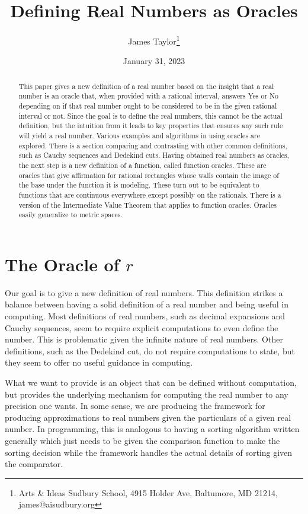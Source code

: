 \documentclass[12pt]{article}
\title{Defining Real Numbers as Oracles}
\author{
  James Taylor\footnote{Arts \& Ideas Sudbury School, 4915 Holder Ave, Baltumore, MD 21214, james@aisudbury.org}
}
\date{January 31, 2023}
\theoremstyle{remark}
\begin{document}
\maketitle
\begin{abstract}
This paper gives a new definition of a real number based on the insight that a real number is an oracle that, when provided with a rational interval, answers Yes or No depending on if that real number ought to be considered to be in the given rational interval or not. Since the goal is to define the real numbers, this cannot be the actual definition, but the intuition from it leads to key properties that ensures any such rule will yield a real number. Various examples and algorithms in using oracles are explored. There is a section comparing and contrasting with  other common definitions, such as Cauchy sequences and Dedekind cuts. Having obtained real numbers as oracles, the next step is a new definition of a function, called function oracles. These are oracles that give affirmation for rational rectangles whose walls contain the image of the base under the function it is modeling. These turn out to be equivalent to functions that are continuous everywhere except possibly on the rationals. There is a version of the Intermediate Value Theorem that applies to function oracles. Oracles easily generalize to metric spaces. 
\end{abstract}

\tableofcontents

\section{The Oracle of $r$}\label{sec:ora}

Our goal is to give a new definition of real numbers. This definition strikes a balance between having a solid definition of a real number and being useful in computing. Most definitions of real numbers, such as decimal expansions and Cauchy sequences, seem to require explicit computations to even define the number. This is problematic given the infinite nature of real numbers. Other definitions, such as the Dedekind cut, do not require computations to state, but they seem to offer no useful guidance in computing. 

What we want to provide is an object that can be defined without computation, but provides the underlying mechanism for computing the real number to any precision one wants. In some sense, we are producing the framework for producing approximations to real numbers given the particulars of a given real number. In programming, this is analogous to having a sorting algorithm written generally which just needs to be given the comparison function to make the sorting decision while the framework handles the actual details of sorting given the comparator. 
\end{document}
